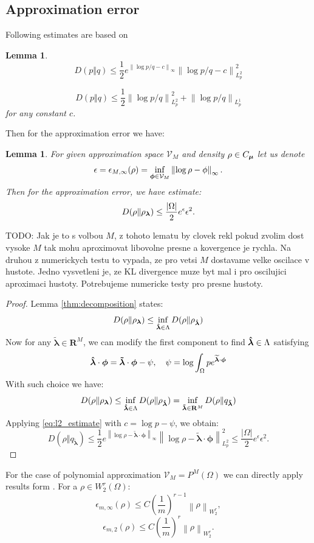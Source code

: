 \documentclass{article}
\newtheorem{lemma}[theorem]{Lemma}
\def\vc#1{\mathbf{\boldsymbol{#1}}}     %
\newcommand{\norm}[1]{\left\lVert#1\right\rVert}
\def\todo#1{{\color{red}TODO: #1}}
\def\R{\mathbf{R}}
\def\abs#1{|#1|}
\begin{document}
\subsection{Approximation error}
Following estimates are based on \cite[Lemma 2]{Barron1991} 
\begin{lemma} 
  \begin{equation}
      \label{eq:l2_estimate}
      D(p\Vert q) \le \frac{1}{2}e^{\norm{\log p/q - c}_\infty} \norm{\log p/ q - c}_{L^2_p}^2
  \end{equation}

  
  \begin{equation}
      \label{eq:l1_estimate}
      D(p\Vert q) \le \frac{1}{2}\norm{\log p/ q}^2_{L^2_p} + \norm{\log p/ q}_{L^1_p}
  \end{equation}
 for any constant $c$.
\end{lemma}

Then for the approximation error we have:
\begin{lemma}
\label{thm:approx_error}
For given approximation space $\mathcal V_M$ and density $\rho\in C_{\vmu}$ let us denote
\[
  \epsilon = \epsilon_{M,\infty}(\rho) = \inf_{\vphi \in \mathcal V_M} \norm{\log \rho - \phi}_\infty.
\]
Then for the approximation error, we have estimate:
\[
D(\rho\Vert\rho_{\vl})  \le \frac{\abs{\Omega}}{2} e^{\epsilon} \epsilon^2.
\]
\end{lemma}
\todo{Jak je to s volbou $M$, z tohoto lematu by clovek rekl pokud zvolim dost vysoke $M$ tak mohu aproximovat libovolne presne a kovergence je rychla. Na druhou z numerickych testu to vypada, ze pro vetsi $M$ dostavame velke oscilace v hustote. Jedno vysvetleni je, ze KL divergence muze byt mal i pro oscilujici aproximaci hustoty. Potrebujeme numericke testy pro presne hustoty.} 
\begin{proof}
Lemma \ref{thm:decomposition} states:
\[
D(\rho\Vert\rho_{\vl}) \le \inf_{\estvl \in \Lambda} D(\rho\Vert\rho_{\estvl})
\]
Now for any $\vc{\tilde\lambda} \in \R^M$, we can modify the first component to find $\estvl \in \Lambda$ satisfying
\[
  \estvl \cdot \vphi = \vc{\tilde\lambda} \cdot \vphi - \psi, \quad \psi 
                             = \log \int_\Omega p e^{\widetilde{\vc\lambda}\cdot \vc \phi}
\]
With such choice we have:
\[
D(\rho\Vert\rho_{\vl}) \le \inf_{\estvl \in \Lambda} D(\rho\Vert\rho_{\estvl})
=\inf_{\vc{\tilde\lambda} \in \R^M} D(\rho\Vert q_{\vc{\tilde\lambda}})
\]
Applying \eqref{eq:l2_estimate} with $c = \log p - \psi$, we obtain:
\[
  D(\rho\Vert q_{\vc{\tilde\lambda}}) \le 
  \frac{1}{2}
  e^{\norm{\log \rho - \vc{\tilde\lambda}\cdot \vc \phi}_\infty} 
    \norm{\log \rho - \vc{\tilde\lambda}\cdot \vc \phi}_{L^2_p}^2
  \le \frac{\abs{\Omega}}{2} e^{\epsilon} \epsilon^2.
\]
\end{proof}
For the case of polynomial approximation $\mathcal V_M = P^M(\Omega)$ we can directly apply results form \cite[Section 7]{Barron1991}. For a $\rho \in W^r_2(\Omega)$:
\[
    \epsilon_{m,\infty}(\rho) \le C \left(\frac{1}{m}\right)^{r-1} \norm{\rho}_{W^r_2},
\]
\[
    \epsilon_{m,2}(\rho) \le C \left(\frac{1}{m}\right)^{r}\norm{\rho}_{W^r_2}.
\]
\end{document}
